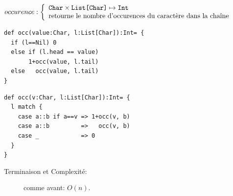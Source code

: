 \documentclass[10pt]{article}\usepackage[correction,nu]{esial}
\begin{document}
\begin{Question}
  $occurence: \left\{
    \begin{array}{l}
      \text{\texttt{Char}}\times \text{\texttt{List[Char]}}\mapsto \text{\texttt{Int}}\\
      \text{retourne le nombre d'occurences du caractère dans la chaîne}
    \end{array}\right.$  
\end{Question}
\begin{Reponse}
  \begin{minipage}{.49\linewidth}
  \begin{Verbatim}
def occ(value:Char, l:List[Char]):Int= {
  if (l==Nil) 0
  else if (l.head == value) 
       1+occ(value, l.tail)
  else   occ(value, l.tail)
}

  \end{Verbatim}    
  \end{minipage}
  \begin{minipage}{.49\linewidth}
  \begin{Verbatim}[numbers=right]
def occ(v:Char, l:List[Char]):Int= {
  l match {
    case a::b if a==v => 1+occ(v, b)
    case a::b         =>   occ(v, b)
    case _            => 0
  }
}
  \end{Verbatim}        
  \end{minipage}
  \begin{description}
  \item[Terminaison et Complexité:] comme avant: $O(n)$. 
  \end{description}
\end{Reponse}
\end{document}
